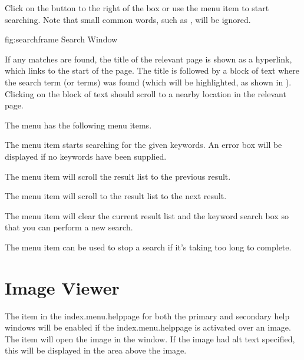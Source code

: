 Click on the  button to the
right of the  box or use the 
menu item to start searching. Note that small common words, such as , will be
ignored.

\FloatFig
{fig:searchframe}
{%
}
{Search Window}

If any matches are found, the title of the relevant
page is shown as a hyperlink, which links to the start of the page.
The title is followed by a block of text where the search term (or
terms) was found (which will be highlighted, as shown in 
). Clicking on the block of text
should scroll to a nearby location in the relevant page.

The  menu has the following
menu items.

The  menu item starts
searching for the given keywords. An error box will be displayed if
no keywords have been supplied.

The  menu item
will scroll the result list to the previous result.

The  menu item will 
scroll to the result list to the next result.

The  menu item will
clear the current result list and the keyword search box so that you
can perform a new search.

The  menu item can be
used to stop a search if it's taking too long to complete.

\section{Image Viewer}
\label{sec:helpimageviewer}

The  item in the \gls{index.menu.helppage}
for both the primary and secondary help windows will be enabled if
the \gls{index.menu.helppage} is activated over an image. The
 item will open the image in the
 window.  If the image had alt text
specified, this will be displayed in the area above the image.

